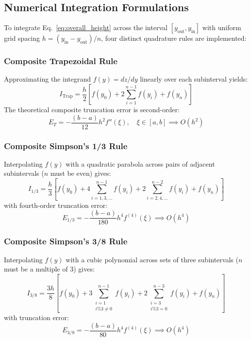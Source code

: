 \documentclass[11pt,a4paper]{article}
\begin{document}
\subsection{Numerical Integration Formulations}
To integrate Eq.~\eqref{eq:overall_height} across the interval $[y_{\text{out}}, y_{\text{in}}]$ with uniform grid spacing $h = (y_{\text{in}} - y_{\text{out}}) / n$, four distinct quadrature rules are implemented:

\subsubsection{Composite Trapezoidal Rule}
Approximating the integrand $f(y) = dz/dy$ linearly over each subinterval yields:
\begin{equation}
I_{\text{Trap}} = \frac{h}{2} \left[ f(y_0) + 2 \sum_{i=1}^{n-1} f(y_i) + f(y_n) \right]
\label{eq:trap_rule}
\end{equation}
The theoretical composite truncation error is second-order:
\begin{equation}
E_T = -\frac{(b-a)}{12} h^2 f''(\xi), \quad \xi \in [a, b] \implies O(h^2)
\end{equation}

\subsubsection{Composite Simpson's 1/3 Rule}
Interpolating $f(y)$ with a quadratic parabola across pairs of adjacent subintervals ($n$ must be even) gives:
\begin{equation}
I_{1/3} = \frac{h}{3} \left[ f(y_0) + 4 \sum_{i=1,3,\dots}^{n-1} f(y_i) + 2 \sum_{i=2,4,\dots}^{n-2} f(y_i) + f(y_n) \right]
\label{eq:simpson_13}
\end{equation}
with fourth-order truncation error:
\begin{equation}
E_{1/3} = -\frac{(b-a)}{180} h^4 f^{(4)}(\xi) \implies O(h^4)
\end{equation}

\subsubsection{Composite Simpson's 3/8 Rule}
Interpolating $f(y)$ with a cubic polynomial across sets of three subintervals ($n$ must be a multiple of 3) gives:
\begin{equation}
I_{3/8} = \frac{3h}{8} \left[ f(y_0) + 3 \sum_{\substack{i=1 \\ i\%3 \ne 0}}^{n-1} f(y_i) + 2 \sum_{\substack{i=3 \\ i\%3 = 0}}^{n-3} f(y_i) + f(y_n) \right]
\label{eq:simpson_38}
\end{equation}
with truncation error:
\begin{equation}
E_{3/8} = -\frac{(b-a)}{80} h^4 f^{(4)}(\xi) \implies O(h^4)
\end{equation}
\end{document}
